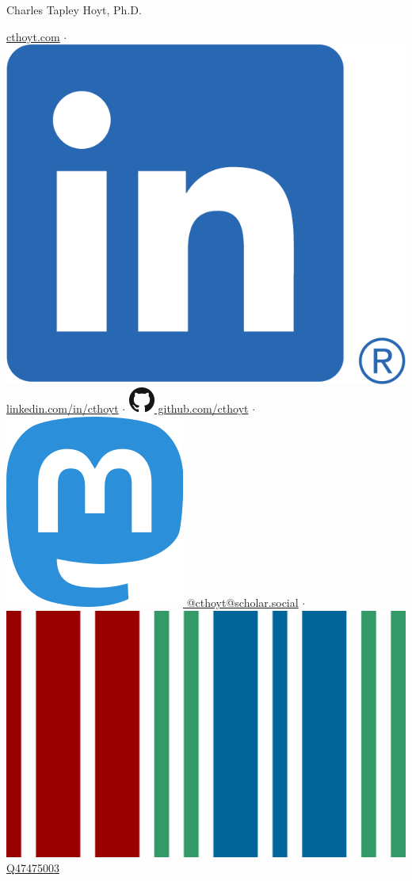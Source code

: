 \documentclass[11pt,a4paper,sans]{moderncv} %
\author{Charles Tapley Hoyt}
\begin{document}
{\Huge Charles Tapley Hoyt, Ph.D.}

\vspace{3mm}

\href{https://cthoyt.com}{cthoyt.com}
$\cdot$
\href{https://linkedin.com/in/cthoyt}{\includegraphics[scale=0.055]{img/LI-In-Bug} linkedin.com/in/cthoyt}
$\cdot$
\href{https://github.com/cthoyt}{\includegraphics[scale=0.25]{img/GitHub-Mark-32px} github.com/cthoyt}
$\cdot$
\href{https://scholar.social/@cthoyt}{\includegraphics[scale=0.035]{img/mastodon} @cthoyt@scholar.social}
$\cdot$
\href{https://www.wikidata.org/wiki/Q47475003}{\includegraphics[scale=0.01]{img/wikidata_logo} Q47475003}
\end{document}
